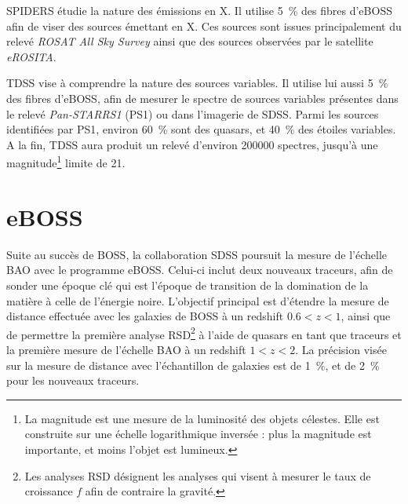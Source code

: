 \begin{itemize}
  SPIDERS étudie la nature des émissions en X. Il utilise \SI{5}{\percent} des fibres d'eBOSS afin de viser des sources émettant en X. Ces sources sont issues principalement du relevé \emph{ROSAT All Sky Survey} ainsi que des sources observées par le satellite \emph{eROSITA}.

  TDSS vise à comprendre la nature des sources variables. Il utilise lui aussi \SI{5}{\percent} des fibres d'eBOSS, afin de mesurer le spectre de sources variables présentes dans le relevé \emph{Pan-STARRS1} (PS1) ou dans l'imagerie de SDSS. Parmi les sources identifiées par PS1, environ \SI{60}{\percent} sont des quasars, et \SI{40}{\percent} des étoiles variables. A la fin, TDSS aura produit un relevé d'environ \num{200000} spectres, jusqu'à une magnitude\footnote{La magnitude est une mesure de la luminosité des objets célestes. Elle est construite sur une échelle logarithmique inversée : plus la magnitude est importante, et moins l'objet est lumineux.} limite de 21.
\end{itemize}



\section{eBOSS}

Suite au succès de BOSS, la collaboration SDSS poursuit la mesure de l'échelle BAO avec le programme eBOSS. Celui-ci inclut deux nouveaux traceurs, afin de sonder une époque clé qui est l'époque de transition de la domination de la matière à celle de l'énergie noire.
L'objectif principal est d'étendre la mesure de distance effectuée avec les galaxies de BOSS à un redshift $\num{0,6} < z < \num{1}$, ainsi que de permettre la première analyse RSD\footnote{Les analyses RSD désignent les analyses qui visent à mesurer le taux de croissance $f$ afin de contraire la gravité.} à l'aide de quasars en tant que traceurs et la première mesure de l'échelle BAO à un redshift $1 < z < 2$.
La précision visée sur la mesure de distance avec l'échantillon de galaxies est de \SI{1}{\percent}, et de \SI{2}{\percent} pour les nouveaux traceurs.



